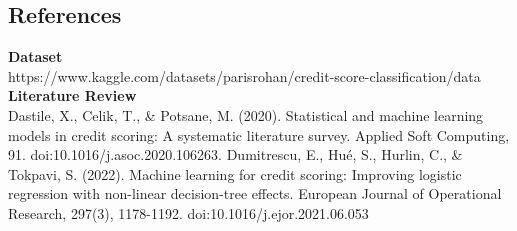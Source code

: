 \documentclass[11pt]{article}
\begin{document}
\begin{multicols}{2}
\section*{References}
\textbf{Dataset}\\
https://www.kaggle.com/datasets/parisrohan/credit-score-classification/data
\vspace{5mm}\newline
\textbf{Literature Review}\\
Dastile, X., Celik, T., \& Potsane, M. (2020).
Statistical and machine learning models in credit scoring: A systematic literature survey.
Applied Soft Computing, 91. doi:10.1016/j.asoc.2020.106263.
\vspace{5mm}\newline
Dumitrescu, E., Hué, S., Hurlin, C., \& Tokpavi, S. (2022). 
Machine learning for credit scoring: Improving logistic regression 
with non-linear decision-tree effects. European Journal of Operational 
Research, 297(3), 1178-1192. doi:10.1016/j.ejor.2021.06.053
\end{multicols}
\end{document}
